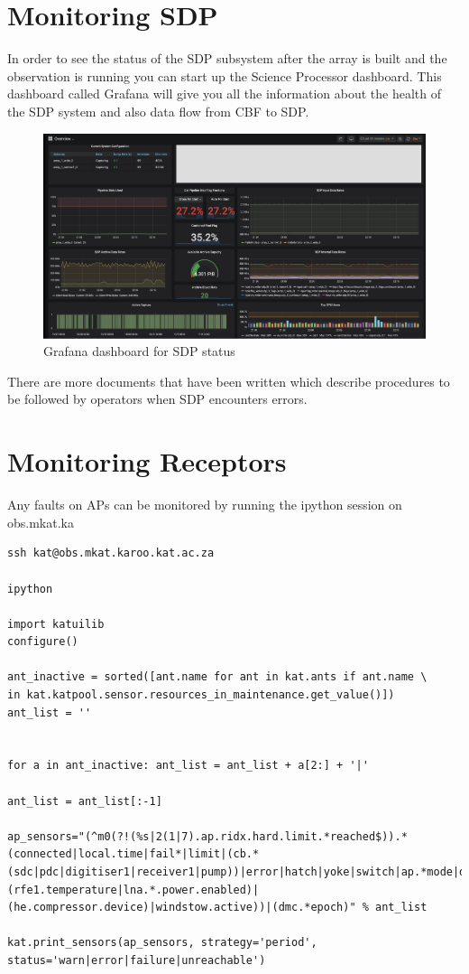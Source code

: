 \section{ Monitoring SDP}

In order to see the status of the SDP subsystem after the array is built and the observation is running you can  start up the Science Processor dashboard. This dashboard called Grafana will give you all the information about the health of the SDP system and also data flow from CBF to SDP. 



\begin{figure}[H]
	\centering
	\includegraphics[scale=0.23]{Chapters/images/image123.png}
	
	\caption{Grafana dashboard for SDP status}
	\label{fig:image123}
\end{figure}


There are more documents that have been written which describe procedures to be followed by operators when SDP encounters errors. 

\section{Monitoring Receptors}

Any faults on APs can be monitored by running the ipython session on obs.mkat.ka
\begin{lstlisting}[style=DOS]
ssh kat@obs.mkat.karoo.kat.ac.za

ipython

import katuilib
configure()

ant_inactive = sorted([ant.name for ant in kat.ants if ant.name \
in kat.katpool.sensor.resources_in_maintenance.get_value()])
ant_list = ''


for a in ant_inactive: ant_list = ant_list + a[2:] + '|'

ant_list = ant_list[:-1]

ap_sensors="(^m0(?!(%s|2(1|7).ap.ridx.hard.limit.*reached$)).*(connected|local.time|fail*|limit|(cb.*(sdc|pdc|digitiser1|receiver1|pump))|error|hatch|yoke|switch|ap.*mode|drive.power|read.error.count|rxl.(rfe1.temperature|lna.*.power.enabled)|(he.compressor.device)|windstow.active))|(dmc.*epoch)" % ant_list

kat.print_sensors(ap_sensors, strategy='period', status='warn|error|failure|unreachable')
\end{lstlisting}




